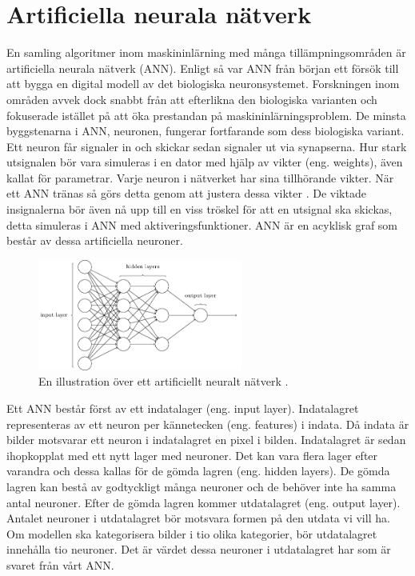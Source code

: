 \documentclass[]{kththesis}
\begin{document}
\section{Artificiella  neurala nätverk}
En samling algoritmer inom maskininlärning med många tillämpningsområden är artificiella neurala nätverk (ANN). Enligt \textcite{Goodfellow-et-al-2016} så var ANN från början ett försök till att bygga en digital modell av det biologiska neuronsystemet. Forskningen inom områden avvek dock snabbt från att efterlikna den biologiska varianten och fokuserade istället på att öka prestandan på maskininlärningsproblem. De minsta byggstenarna i ANN, neuronen, fungerar fortfarande som dess biologiska variant. Ett neuron får signaler in och skickar sedan signaler ut via synapserna. Hur stark utsignalen bör vara simuleras i en dator med hjälp av vikter (eng. weights), även kallat för parametrar. Varje neuron i nätverket har sina tillhörande vikter. När ett ANN tränas så görs detta genom att justera dessa vikter \parencite{Goodfellow-et-al-2016}. De viktade insignalerna bör även nå upp till en viss tröskel för att en utsignal ska skickas, detta simuleras i ANN med aktiveringsfunktioner. ANN är en acyklisk graf som består av dessa artificiella neuroner.

\begin{figure}[h]
  \centering
  \includegraphics[width=0.6\textwidth]{nn}
  \caption{En illustration över ett artificiellt neuralt nätverk \parencite{nielsen2015neural}.}
\end{figure}

Ett ANN består först av ett indatalager (eng. input layer). Indatalagret representeras av ett neuron per kännetecken (eng. features) i indata. Då indata är bilder motsvarar ett neuron i indatalagret en pixel i bilden. Indatalagret är sedan ihopkopplat med ett nytt lager med neuroner. Det kan vara flera lager efter varandra och dessa kallas för de gömda lagren (eng. hidden layers). De gömda lagren kan bestå av godtyckligt många neuroner och de behöver inte ha samma antal neuroner. Efter de gömda lagren kommer utdatalagret (eng. output layer). Antalet neuroner i utdatalagret bör motsvara formen på den utdata vi vill ha. Om modellen ska kategorisera bilder i tio olika kategorier, bör utdatalagret innehålla tio neuroner. Det är värdet dessa neuroner i utdatalagret har som är svaret från vårt ANN.
\end{document}
